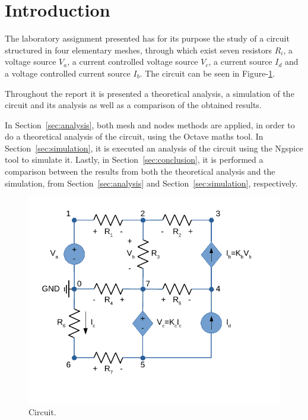 \section{Introduction}
\label{sec:introduction}

The laboratory assignment presented has for its purpose the study of a circuit
structured in four elementary meshes, through which exist seven resistors $R_i$,
a voltage source $V_a$, a current controlled voltage source $V_c$, a current
source $I_d$ and a voltage controlled current source $I_b$. The circuit can
be seen in Figure-\ref{fig:circuit}.


Throughout the report it is presented a theoretical analysis, a simulation of the
circuit and its analysis as well as a comparison of the obtained results. \par
In Section~\ref{sec:analysis},  both mesh and nodes methods are applied, in order to do
a theoretical analysis of the circuit, using the Octave maths tool.
In Section~\ref{sec:simulation}, it is executed an analysis of the circuit using
the Ngspice tool to simulate it. Lastly, in Section~\ref{sec:conclusion}, it is
performed a comparison between the results from both the theoretical analysis
and the simulation, from Section~\ref{sec:analysis} and Section~\ref{sec:simulation},
respectively.


\begin{figure}[H] \centering
\includegraphics[width=0.7\linewidth]{circuit.pdf}
\caption{Circuit.}
\label{fig:circuit}
\end{figure}

